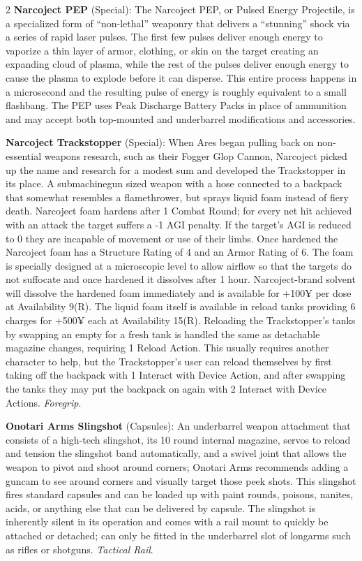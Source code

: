 \documentclass[
  oneside]{article}
\begin{document}
\begin{multicols}{2}
\textbf{Narcoject PEP} (Special): The Narcoject
PEP, or Pulsed Energy Projectile, is a specialized
form of ``non-lethal'' weaponry that delivers a
``stunning'' shock via a series of rapid laser
pulses. The first few pulses deliver enough energy
to vaporize a thin layer of armor, clothing, or
skin on the target creating an expanding cloud of
plasma, while the rest of the pulses deliver
enough energy to cause the plasma to explode
before it can disperse. This entire process
happens in a microsecond and the resulting pulse
of energy is roughly equivalent to a small
flashbang. The PEP uses Peak Discharge Battery
Packs in place of ammunition and may accept both
top-mounted and underbarrel modifications and
accessories.

\textbf{Narcoject Trackstopper} (Special): When
Ares began pulling back on non-essential weapons
research, such as their Fogger Glop Cannon,
Narcoject picked up the name and research for a
modest sum and developed the Trackstopper in its
place. A submachinegun sized weapon with a hose
connected to a backpack that somewhat resembles a
flamethrower, but sprays liquid foam instead of
fiery death. Narcoject foam hardens after 1 Combat
Round; for every net hit achieved with an attack
the target suffers a -1 AGI penalty. If the
target's AGI is reduced to 0 they are incapable of
movement or use of their limbs. Once hardened the
Narcoject foam has a Structure Rating of 4 and an
Armor Rating of 6. The foam is specially designed
at a microscopic level to allow airflow so that
the targets do not suffocate and once hardened it
dissolves after 1 hour. Narcoject-brand solvent
will dissolve the hardened foam immediately and is
available for +100¥ per dose at Availability 9(R).
The liquid foam itself is available in reload
tanks providing 6 charges for +500¥ each at
Availability 15(R). Reloading the Trackstopper's
tanks by swapping an empty for a fresh tank is
handled the same as detachable magazine changes,
requiring 1 Reload Action. This usually requires
another character to help, but the Trackstopper's
user can reload themselves by first taking off the
backpack with 1 Interact with Device Action, and
after swapping the tanks they may put the backpack
on again with 2 Interact with Device Actions.
\emph{Foregrip}.

\textbf{Onotari Arms Slingshot} (Capsules): An
underbarrel weapon attachment that consists of a
high-tech slingshot, its 10 round internal
magazine, servos to reload and tension the
slingshot band automatically, and a swivel joint
that allows the weapon to pivot and shoot around
corners; Onotari Arms recommends adding a guncam
to see around corners and visually target those
peek shots. This slingshot fires standard capsules
and can be loaded up with paint rounds, poisons,
nanites, acids, or anything else that can be
delivered by capsule. The slingshot is inherently
silent in its operation and comes with a rail
mount to quickly be attached or detached; can only
be fitted in the underbarrel slot of longarms such
as rifles or shotguns. \emph{Tactical Rail}.


\end{multicols}
\end{document}
